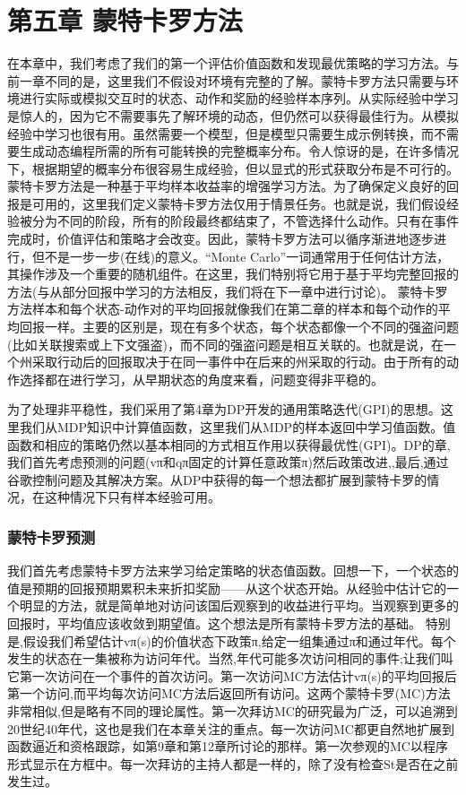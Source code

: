 \chapter{第五章 蒙特卡罗方法}
\begin{summary}
	在本章中，我们考虑了我们的第一个评估价值函数和发现最优策略的学习方法。与前一章不同的是，这里我们不假设对环境有完整的了解。蒙特卡罗方法只需要与环境进行实际或模拟交互时的状态、动作和奖励的经验样本序列。从实际经验中学习是惊人的，因为它不需要事先了解环境的动态，但仍然可以获得最佳行为。从模拟经验中学习也很有用。虽然需要一个模型，但是模型只需要生成示例转换，而不需要生成动态编程所需的所有可能转换的完整概率分布。令人惊讶的是，在许多情况下，根据期望的概率分布很容易生成经验，但以显式的形式获取分布是不可行的。
	蒙特卡罗方法是一种基于平均样本收益率的增强学习方法。为了确保定义良好的回报是可用的，这里我们定义蒙特卡罗方法仅用于情景任务。也就是说，我们假设经验被分为不同的阶段，所有的阶段最终都结束了，不管选择什么动作。只有在事件完成时，价值评估和策略才会改变。因此，蒙特卡罗方法可以循序渐进地逐步进行，但不是一步一步(在线)的意义。“Monte Carlo”一词通常用于任何估计方法，其操作涉及一个重要的随机组件。在这里，我们特别将它用于基于平均完整回报的方法(与从部分回报中学习的方法相反，我们将在下一章中进行讨论)。
	蒙特卡罗方法样本和每个状态-动作对的平均回报就像我们在第二章的样本和每个动作的平均回报一样。主要的区别是，现在有多个状态，每个状态都像一个不同的强盗问题(比如关联搜索或上下文强盗)，而不同的强盗问题是相互关联的。也就是说，在一个州采取行动后的回报取决于在同一事件中在后来的州采取的行动。由于所有的动作选择都在进行学习，从早期状态的角度来看，问题变得非平稳的。
	
	为了处理非平稳性，我们采用了第4章为DP开发的通用策略迭代(GPI)的思想。这里我们从MDP知识中计算值函数，这里我们从MDP的样本返回中学习值函数。值函数和相应的策略仍然以基本相同的方式相互作用以获得最优性(GPI)。DP的章,我们首先考虑预测的问题(vπ和qπ固定的计算任意政策π)然后政策改进,,最后,通过谷歌控制问题及其解决方案。从DP中获得的每一个想法都扩展到蒙特卡罗的情况，在这种情况下只有样本经验可用。
	
\end{summary}

\subsection{蒙特卡罗预测}

我们首先考虑蒙特卡罗方法来学习给定策略的状态值函数。回想一下，一个状态的值是预期的回报预期累积未来折扣奖励——从这个状态开始。从经验中估计它的一个明显的方法，就是简单地对访问该国后观察到的收益进行平均。当观察到更多的回报时，平均值应该收敛到期望值。这个想法是所有蒙特卡罗方法的基础。
特别是,假设我们希望估计vπ(s)的价值状态下政策π,给定一组集通过π和通过年代。每个发生的状态在一集被称为访问年代。当然,年代可能多次访问相同的事件;让我们叫它第一次访问在一个事件的首次访问。第一次访问MC方法估计vπ(s)的平均回报后第一个访问,而平均每次访问MC方法后返回所有访问。这两个蒙特卡罗(MC)方法非常相似,但是略有不同的理论属性。第一次拜访MC的研究最为广泛，可以追溯到20世纪40年代，这也是我们在本章关注的重点。每一次访问MC都更自然地扩展到函数逼近和资格跟踪，如第9章和第12章所讨论的那样。第一次参观的MC以程序形式显示在方框中。每一次拜访的主持人都是一样的，除了没有检查St是否在之前发生过。

